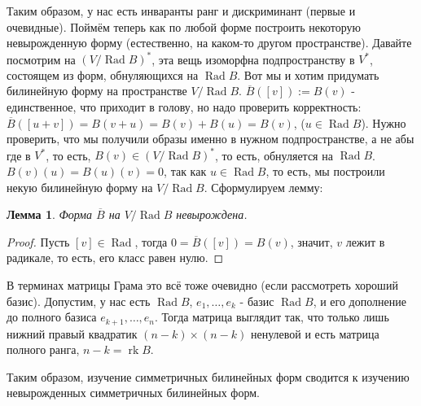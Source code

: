 \documentclass[a4paper,100pt]{article}
\theoremstyle{indented}
\newtheorem{lemma}{Лемма}
\theoremstyle{definition}
\theoremstyle{remark}
\DeclareMathOperator{\Rad}{Rad}
\DeclareMathOperator{\rk}{rk}
\begin{document}
Таким образом, у нас есть инваранты ранг и дискриминант (первые и очевидные). Поймём теперь как по любой форме построить некоторую невырожденную форму (естественно, на каком-то другом пространстве). Давайте посмотрим на $(V/\Rad B)^*$, эта вещь изоморфна подпространству в $V^*$, состоящем из форм, обнуляющихся на $\Rad B$. Вот мы и хотим придумать билинейную форму на пространстве $V/\Rad B$. $\overline{B}([v]):=B(v)$ - единственное, что приходит в голову, но надо проверить корректность: $\overline{B}([u+v])=B(v+u)=B(v)+B(u)=B(v)$, ($u \in \Rad B$). Нужно проверить, что мы получили образы именно в нужном подпространстве, а не абы где в $V^*$, то есть, $B(v)\in(V/\Rad B)^*$, то есть, обнуляется на $\Rad B$. $B(v)(u)=B(u)(v)=0$, так как $u\in \Rad B$, то есть, мы построили некую билинейную форму на $V /\Rad B$. Сформулируем лемму: \\

\begin{lemma}
    Форма $\overline{B}$ на $V/\Rad B$ невырождена.
\end{lemma}

\begin{proof}
    Пусть $[v]\in \Rad $, тогда $0=\overline{B}([v])=B(v)$, значит, $v$ лежит в радикале, то есть, его класс равен нулю.
\end{proof}

В терминах матрицы Грама это всё тоже очевидно (если рассмотреть хороший базис). Допустим, у нас есть $\Rad B$, $e_1, \ldots, e_k$ - базис $\Rad B$, и его дополнение до полного базиса $e_{k+1}, \ldots, e_n$. Тогда матрица выглядит так, что только лишь нижний правый квадратик $(n-k)\times (n-k)$ ненулевой и есть матрица полного ранга, $n-k=\rk B$. \ 

Таким образом, изучение симметричных билинейных форм сводится к изучению невырожденных симметричных билинейных форм. 
\end{document}
